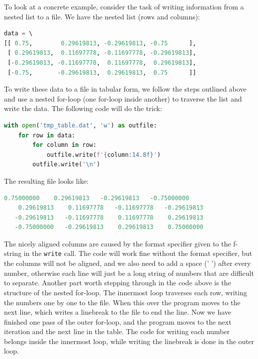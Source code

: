 \documentclass[graybox,envcountchap,sectrefs,final]{svmonodo}
\begin{document}
To look at a concrete example, consider the task of writing information from a nested list to a file. We have the nested list
(rows and columns):
\begin{lstlisting}[language=Python,style=blue1]
data = \ 
[[ 0.75,        0.29619813, -0.29619813, -0.75      ],
 [ 0.29619813,  0.11697778, -0.11697778, -0.29619813],
 [-0.29619813, -0.11697778,  0.11697778,  0.29619813],
 [-0.75,       -0.29619813,  0.29619813,  0.75      ]]
\end{lstlisting}
To write these data to a file in tabular form, we follow the steps outlined above and use a nested for-loop (one for-loop inside
another) to traverse the list and write the data. The following code will do the trick:
\begin{lstlisting}[language=Python,style=blue1]
with open('tmp_table.dat', 'w') as outfile:
    for row in data:
        for column in row:
            outfile.write(f'{column:14.8f}')
        outfile.write('\n')
\end{lstlisting}
The resulting file looks like:
\begin{lstlisting}[language=Python,style=gray]
    0.75000000    0.29619813   -0.29619813   -0.75000000
    0.29619813    0.11697778   -0.11697778   -0.29619813
   -0.29619813   -0.11697778    0.11697778    0.29619813
   -0.75000000   -0.29619813    0.29619813    0.75000000
\end{lstlisting}
The nicely aligned columns are caused by the format specifier given to the f-string in the \texttt{write} call.
The code will work fine without the format specifier, but the columns will not be aligned, and we
also need to add a space (' ') after every number,
otherwise each line will just be a long string of numbers that are difficult to separate.
Another part worth stepping through in the code above is the structure of the nested for-loop.
The innermost loop traverses each row, writing the numbers one by one to the file. When this over the program moves to the next
line, which writes a linebreak to the file to end the line. Now we have finished one pass of the outer for-loop, and the
program moves to the next iteration and the next line in the table. The code for writing each number belongs inside
the innermost loop, while writing the linebreak is done in the outer loop.
\end{document}
